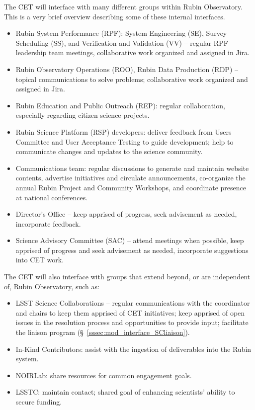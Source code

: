 \documentclass[DM,lsstdraft,toc]{lsstdoc}
\begin{document}
The CET will interface with many different groups within Rubin Observatory. 
This is a very brief overview describing some of these internal interfaces.
\begin{itemize}
\item Rubin System Performance (RPF): System Engineering (SE), Survey Scheduling (SS), and Verification and Validation (VV) -- regular RPF leadership team meetings, collaborative work organized and assigned in Jira.
\item Rubin Observatory Operations (ROO), Rubin Data Production (RDP) -- topical communications to solve problems; collaborative work organized and assigned in Jira.
\item Rubin Education and Public Outreach (REP): regular collaboration, especially regarding citizen science projects.
\item Rubin Science Platform (RSP) developers: deliver feedback from Users Committee and User Acceptance Testing to guide development; help to communicate changes and updates to the science community.
\item Communications team: regular discussions to generate and maintain website contents, advertise initiatives and circulate announcements, co-organize the annual Rubin Project and Community Workshops, and coordinate presence at national conferences.
\item Director's Office -- keep apprised of progress, seek advisement as needed, incorporate feedback.
\item Science Advisory Committee (SAC) -- attend meetings when possible, keep apprised of progress and seek advisement as needed, incorporate suggestions into CET work.
\end{itemize}

The CET will also interface with groups that extend beyond, or are independent of, Rubin Observatory, such as:
\begin{itemize}
\item LSST Science Collaborations -- regular communications with the coordinator and chairs to keep them apprised of CET initiatives; keep apprised of open issues in the resolution process and opportunities to provide input; facilitate the liaison program (\S~\ref{sssec:mod_interface_SCliaison}).
\item In-Kind Contributors: assist with the ingestion of deliverables into the Rubin system.
\item NOIRLab: share resources for common engagement goals.
\item LSSTC: maintain contact; shared goal of enhancing scientists' ability to secure funding.
\end{itemize}
\end{document}
